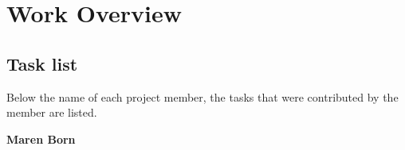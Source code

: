
\section{Work Overview}

\subsection{Task list}

Below the name of each project member, the tasks that were contributed by the member are listed.

\renewcommand{\labelitemi}{$\circ$}
\renewcommand{\labelitemii}{$\bullet$}
\renewcommand{\labelitemiii}{$\cdot$}
\bigskip
\textbf{Maren Born}
